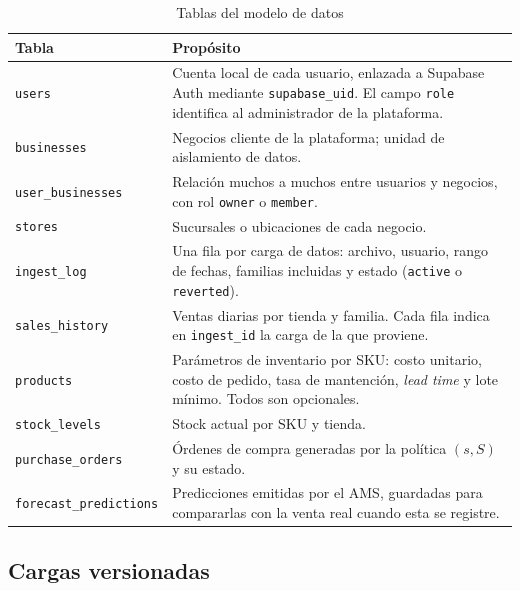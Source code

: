\documentclass[12pt, a4paper]{report}
\begin{document}
\begin{table}[H]
  \centering
  \caption{Tablas del modelo de datos}
  \label{tab:tablas}
  \small
  \begin{tabular}{|p{3.9cm}|p{9.7cm}|}
    \hline
    \textbf{Tabla} & \textbf{Propósito} \\
    \hline
    \texttt{users}                & Cuenta local de cada usuario, enlazada a Supabase Auth mediante
                                    \texttt{supabase\_uid}. El campo \texttt{role} identifica al
                                    administrador de la plataforma. \\
    \texttt{businesses}           & Negocios cliente de la plataforma; unidad de aislamiento de datos. \\
    \texttt{user\_businesses}     & Relación muchos a muchos entre usuarios y negocios, con rol
                                    \texttt{owner} o \texttt{member}. \\
    \texttt{stores}               & Sucursales o ubicaciones de cada negocio. \\
    \texttt{ingest\_log}          & Una fila por carga de datos: archivo, usuario, rango de fechas,
                                    familias incluidas y estado (\texttt{active} o \texttt{reverted}). \\
    \texttt{sales\_history}       & Ventas diarias por tienda y familia. Cada fila indica en
                                    \texttt{ingest\_id} la carga de la que proviene. \\
    \texttt{products}             & Parámetros de inventario por SKU: costo unitario, costo de pedido,
                                    tasa de mantención, \textit{lead time} y lote mínimo. Todos son
                                    opcionales. \\
    \texttt{stock\_levels}        & Stock actual por SKU y tienda. \\
    \texttt{purchase\_orders}     & Órdenes de compra generadas por la política $(s, S)$ y su estado. \\
    \texttt{forecast\_predictions} & Predicciones emitidas por el AMS, guardadas para compararlas con la
                                    venta real cuando esta se registre. \\
    \hline
  \end{tabular}
\end{table}

\subsection{Cargas versionadas}
\end{document}
